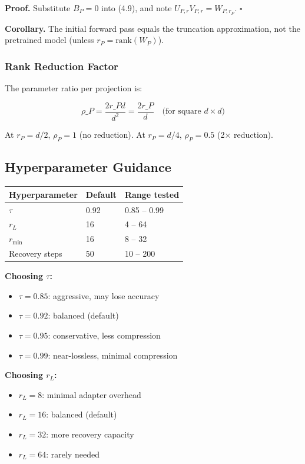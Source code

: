 \textbf{Proof.} Substitute $B_P = 0$ into (4.9), and note $U_{P, r} V_{P, r} = W_{P, r_P}$. 
$\square$

\textbf{Corollary.} The initial forward pass equals the truncation approximation, 
not the pretrained model (unless $r_P = \text{rank}(W_P)$).

\subsubsection{Rank Reduction Factor}

The parameter ratio per projection is:

\[
\rho\_P = \frac{2 r\_P d}{d^2} = \frac{2 r\_P}{d} \quad \text{(for square } d \times d\text{)}
\tag{4.13}
\]

At $r_P = d/2$, $\rho_P = 1$ (no reduction). At $r_P = d/4$, $\rho_P = 0.5$ (2$\times$ reduction).

\subsection{Hyperparameter Guidance}

\begin{table}[H]
\centering
\small
\begin{tabular}{lll}
\toprule
\textbf{Hyperparameter} & \textbf{Default} & \textbf{Range tested} \\
\midrule
$\tau$ & 0.92 & 0.85 -- 0.99 \\
$r_L$ & 16 & 4 -- 64 \\
$r_\text{min}$ & 16 & 8 -- 32 \\
Recovery steps & 50 & 10 -- 200 \\
\bottomrule
\end{tabular}
\end{table}

\textbf{Choosing $\tau$:}

\begin{itemize}
\item $\tau = 0.85$: aggressive, may lose accuracy
\item $\tau = 0.92$: balanced (default)
\item $\tau = 0.95$: conservative, less compression
\item $\tau = 0.99$: near-lossless, minimal compression

\end{itemize}
\textbf{Choosing $r_L$:}

\begin{itemize}
\item $r_L = 8$: minimal adapter overhead
\item $r_L = 16$: balanced (default)
\item $r_L = 32$: more recovery capacity
\item $r_L = 64$: rarely needed
\end{itemize}

